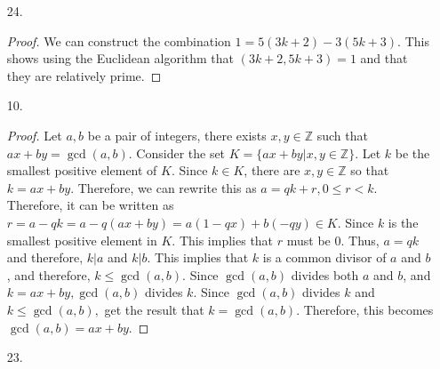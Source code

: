\documentclass[11pt]{article}
\theoremstyle{definition}
\newcommand{\Z}{\mathbb{Z}}
\begin{document}
\begin{enumerate}
    \begin{proof}
    For $n=1,$ $a_1 = 1 * a_1$. Let $n = k$ and let the greatest common divisor of $a_1, a_2, ..., a_{k-1}, a_k$ be $d$, which is the least positive integer that is a linear combination of $a_1, a_2, ..., a_{k-1}, a_k$. So, $a_1x_1 + a_2x_2+...+ a_kx_k = d.$ Let D be the gcd of $a_1, a_2, ..., a_k, a_{k+1}.$ So then, $D = (a_1, a_2, ..., a_k, a_{k+1}) = ((a_1, a_2, ..., a_k), a_{k+1}) = (d, a_{k+1})$. Since we have that $D$ is the gcd of $d$ and $a_{k+1}$, there are integers $y_1, y_2$ such that $dy_1+a_{k+1}y_2$ is least. So $D = dy_1 + a_{k+1}y_2$. Now we get that $D = (a_1x_1 + a_2x_2 + ... a_kx_k)y_1 + a_{k+1}y_2 = a_1(x_1y_1) + a_2(x_2y_1) + ... + a_k(x_ky_1) + a_{k+1}y_2.$ Therefore, $a_1, a_2, ..., a_{n-1}, a_n$, not all zero, is the least positive integer that is a linear combination of $a_1, a_2, ..., a_n.$
    \end{proof}
    
    \newpage
    \item [24. ]
    
    \begin{proof}
    We can construct the combination $1 = 5(3k+2) - 3(5k+3).$ This shows using the Euclidean algorithm that $(3k+2, 5k+3) = 1$ and that they are relatively prime.
    \end{proof}
    
    \newpage
    \item [10. ]
    
    \begin{proof}
    Let $a, b$ be a pair of integers, there exists $x, y\in \Z$ such that $ax+by = \gcd(a, b).$ Consider the set $K = \{ax+by|x, y\in \Z\}$. Let $k$ be the smallest positive element of $K.$ Since $k\in K$, there are $x, y\in \Z$ so that $k = ax+by.$ Therefore, we can rewrite this as $a = qk + r, 0\leq r< k.$ Therefore, it can be written as $r = a-qk = a - q(ax+by) = a(1-qx) + b(-qy)\in K.$ Since $k$ is the smallest positive element in $K$. This implies that $r$ must be $0.$ Thus, $a = qk$ and therefore, $k|a$ and $k|b.$ This implies that $k$ is a common divisor of $a$ and $b$, and therefore, $k \leq \gcd(a, b).$ Since $\gcd(a, b)$ divides both $a$ and $b$, and $k = ax+by, \gcd(a, b)$ divides $k.$ Since $\gcd(a, b)$ divides $k$ and $k\leq \gcd(a, b),$ get the result that $k = \gcd(a, b).$ Therefore, this becomes $\gcd(a, b) = ax + by.$
    \end{proof}
    
    \newpage
    \item [23. ]
    

\end{enumerate}
\end{document}

